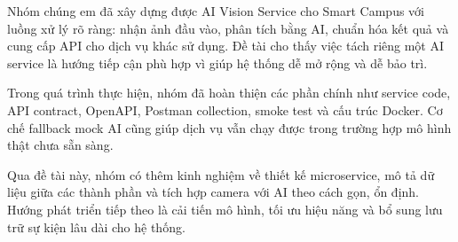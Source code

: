 
Nhóm chúng em đã xây dựng được AI Vision Service cho Smart Campus với luồng xử lý rõ ràng: nhận ảnh đầu vào, phân tích bằng AI, chuẩn hóa kết quả và cung cấp API cho dịch vụ khác sử dụng. Đề tài cho thấy việc tách riêng một AI service là hướng tiếp cận phù hợp vì giúp hệ thống dễ mở rộng và dễ bảo trì.

Trong quá trình thực hiện, nhóm đã hoàn thiện các phần chính như service code, API contract, OpenAPI, Postman collection, smoke test và cấu trúc Docker. Cơ chế fallback mock AI cũng giúp dịch vụ vẫn chạy được trong trường hợp mô hình thật chưa sẵn sàng.

Qua đề tài này, nhóm có thêm kinh nghiệm về thiết kế microservice, mô tả dữ liệu giữa các thành phần và tích hợp camera với AI theo cách gọn, ổn định. Hướng phát triển tiếp theo là cải tiến mô hình, tối ưu hiệu năng và bổ sung lưu trữ sự kiện lâu dài cho hệ thống.
